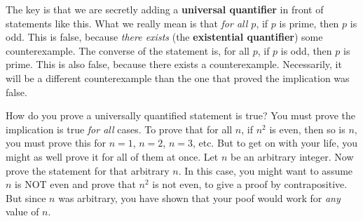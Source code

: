 \documentclass[10pt,]{book}
\newcommand{\terminology}[1]{\textbf{#1}}
\theoremstyle{plain}
\theoremstyle{definition}
\theoremstyle{definition}
\theoremstyle{definition}
\numberwithin{equation}{chapter}
\begin{document}
\par
\hypertarget{p-176}{}%
The key is that we are secretly adding a \terminology{universal quantifier} in front of statements like this.  What we really mean is that \emph{for all \(p\)}, if \(p\) is prime, then \(p\) is odd.  This is false, because \emph{there exists} (the \terminology{existential quantifier}) some counterexample.  The converse of the statement is, for all \(p\), if \(p\) is odd, then \(p\) is prime.  This is also false, because there exists a counterexample.  Necessarily, it will be a different counterexample than the one that proved the implication was false.%
\par
\hypertarget{p-177}{}%
How do you prove a universally quantified statement is true?  You must prove the implication is true \emph{for all} cases.  To prove that for all \(n\), if \(n^2\) is even, then so is \(n\), you must prove this for \(n = 1\), \(n = 2\), \(n =3\), etc.  But to get on with your life, you might as well prove it for all of them at once.  Let \(n\) be an arbitrary integer.  Now prove the statement for that arbitrary \(n\).  In this case, you might want to assume \(n\) is NOT even and prove that \(n^2\) is not even, to give a proof by contrapositive.  But since \(n\) was arbitrary, you have shown that your poof would work for \emph{any} value of \(n\).%
\typeout{************************************************}
\typeout{************************************************}
\end{document}
